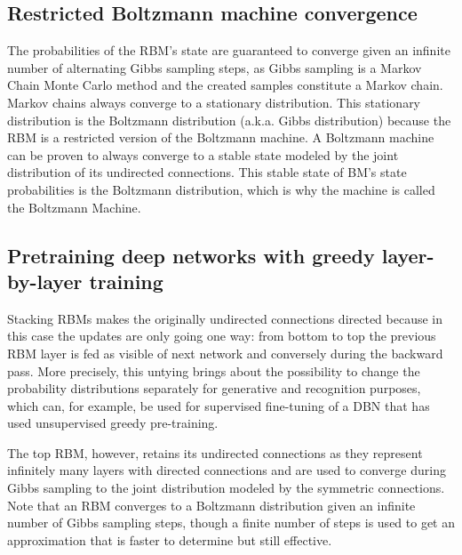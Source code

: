 \documentclass[a4paper]{article}
\begin{document}
\subsection{Restricted Boltzmann machine convergence}
The probabilities of the RBM's state are guaranteed to converge given an infinite number of alternating Gibbs sampling steps, as Gibbs sampling is a Markov Chain Monte Carlo method and the created samples constitute a Markov chain. Markov chains always converge to a stationary distribution. This stationary distribution is the Boltzmann distribution (a.k.a. Gibbs distribution) because the RBM is a restricted version of the Boltzmann machine. A Boltzmann machine can be proven to always converge to a stable state modeled by the joint distribution of its undirected connections. This stable state of BM's state probabilities is the Boltzmann distribution, which is why the machine is called the Boltzmann Machine.

\subsection{Pretraining deep networks with greedy layer-by-layer training}

Stacking RBMs makes the originally undirected connections directed because in this case the updates are only going one way: from bottom to top the previous RBM layer is fed as visible of next network and conversely during the backward pass. More precisely, this untying brings about the possibility to change the probability distributions separately for generative and recognition purposes, which can, for example, be used for supervised fine-tuning of a DBN that has used unsupervised greedy pre-training.

The top RBM, however, retains its undirected connections as they represent infinitely many layers with directed connections and are used to converge during Gibbs sampling to the joint distribution modeled by the symmetric connections. Note that an RBM converges to a Boltzmann distribution given an infinite number of Gibbs sampling steps, though a finite number of steps is used to get an approximation that is faster to determine but still effective. 
\end{document}
